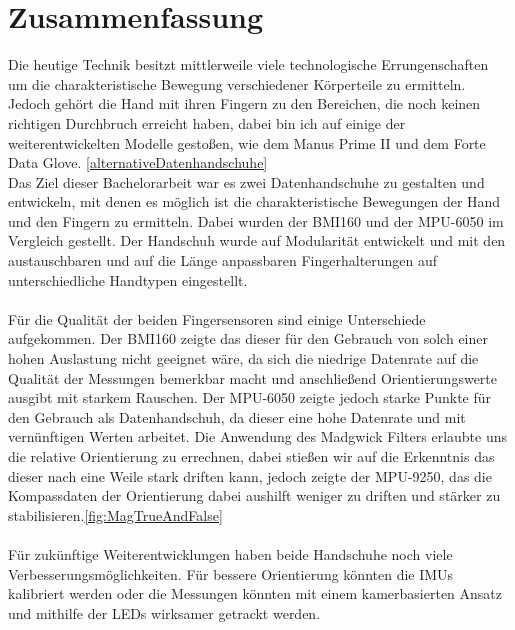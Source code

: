 \chapter{Zusammenfassung}



Die heutige Technik besitzt mittlerweile viele technologische Errungenschaften um die charakteristische Bewegung verschiedener Körperteile zu ermitteln. Jedoch gehört die Hand mit ihren Fingern zu den Bereichen, die noch keinen richtigen Durchbruch erreicht haben, dabei bin ich auf einige der weiterentwickelten Modelle gestoßen, wie dem Manus Prime II und dem Forte Data Glove. \ref{alternativeDatenhandschuhe}
\\
Das Ziel dieser Bachelorarbeit war es zwei Datenhandschuhe zu gestalten und entwickeln, mit denen es möglich ist die charakteristische Bewegungen der Hand und den Fingern zu ermitteln. Dabei wurden der BMI160 und der MPU-6050 im Vergleich gestellt. Der Handschuh wurde auf Modularität entwickelt und mit den austauschbaren und auf die Länge anpassbaren Fingerhalterungen auf unterschiedliche Handtypen eingestellt.
\\
\\
Für die Qualität der beiden Fingersensoren sind einige Unterschiede aufgekommen.
Der BMI160 zeigte das dieser für den Gebrauch von solch einer hohen Auslastung nicht geeignet wäre, da sich die niedrige Datenrate auf die Qualität der Messungen bemerkbar macht und anschließend Orientierungswerte ausgibt mit starkem Rauschen.
Der MPU-6050 zeigte jedoch starke Punkte für den Gebrauch als Datenhandschuh, da dieser eine hohe Datenrate und mit vernünftigen Werten arbeitet. Die Anwendung des Madgwick Filters erlaubte uns die relative Orientierung zu errechnen, dabei stießen wir auf die Erkenntnis das dieser nach eine Weile stark driften kann, jedoch zeigte der MPU-9250, das die Kompassdaten der Orientierung dabei aushilft weniger zu driften und stärker zu stabilisieren.\ref{fig:MagTrueAndFalse}
\\
\\
Für zukünftige Weiterentwicklungen haben beide Handschuhe noch viele Verbesserungsmöglichkeiten. Für bessere Orientierung könnten die IMUs kalibriert werden oder die Messungen könnten mit einem kamerbasierten Ansatz und mithilfe der LEDs wirksamer getrackt werden. 